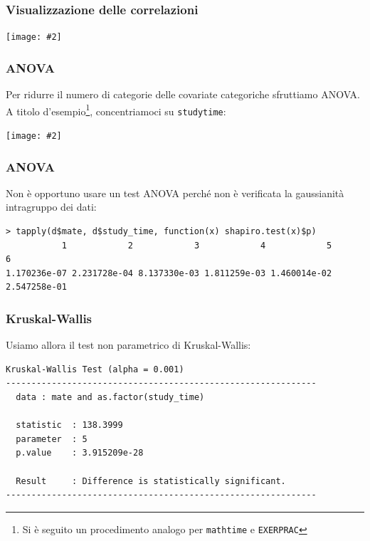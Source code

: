 \documentclass{beamer}
\newcommand{\fg}[2]{%
  \begin{center}
      \texttt{[image: \#2]}%
  \end{center}
}
\begin{document}
\begin{frame}
\frametitle{Visualizzazione delle correlazioni}
\fg{0.6}{cor.png}
\end{frame}



\begin{frame}
\frametitle{ANOVA}
Per ridurre il numero di categorie delle covariate categoriche sfruttiamo ANOVA. 
A titolo d'esempio\footnote{Si è seguito un procedimento analogo per \texttt{mathtime} e \texttt{EXERPRAC}}, concentriamoci su \texttt{studytime}:
\fg{0.6}{boxplotst.png}
\end{frame}

\begin{frame}[fragile]
\frametitle{ANOVA}
Non è opportuno usare un test ANOVA perché non è verificata la gaussianità intragruppo dei dati: 

{\scriptsize
\begin{verbatim}
> tapply(d$mate, d$study_time, function(x) shapiro.test(x)$p)
           1            2            3            4            5            6 
1.170236e-07 2.231728e-04 8.137330e-03 1.811259e-03 1.460014e-02 2.547258e-01 
\end{verbatim}
} 
\end{frame}

\begin{frame}[fragile]
\frametitle{Kruskal-Wallis}
Usiamo allora il test non parametrico di Kruskal-Wallis:
{\scriptsize
\begin{verbatim}
Kruskal-Wallis Test (alpha = 0.001) 
------------------------------------------------------------- 
  data : mate and as.factor(study_time) 

  statistic  : 138.3999 
  parameter  : 5 
  p.value    : 3.915209e-28 

  Result     : Difference is statistically significant. 
------------------------------------------------------------- 
\end{verbatim}
} 
\end{frame}
\end{document}

